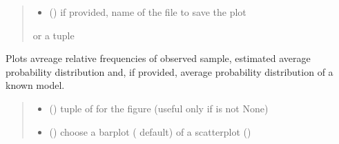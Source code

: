\documentclass[letterpaper,10pt,english]{sphinxmanual}
\begin{document}
\begin{fulllineitems}
\begin{fulllineitems}
\begin{quote}
\begin{description}
\begin{itemize}
\item {} 
\sphinxAtStartPar
{} () \textendash{} if provided, name of the file to save the plot

\end{itemize}

\sphinxAtStartPar
{} or a tuple 

\end{description}\end{quote}

\end{fulllineitems}


\begin{fulllineitems}
\label{\detokenize{cubmods:cubmods.ihg_v.CUBresIHGV.plot_ordinal}}
\pysigstartsignatures
{}
\pysigstopsignatures
\sphinxAtStartPar
Plots avreage relative frequencies of observed sample, estimated 
average probability distribution and,
if provided, average probability distribution of a known model.
\begin{quote}\begin{description}
\begin{itemize}
\item {} 
\sphinxAtStartPar
{} () \textendash{} tuple of  for the figure (useful only if  is not None)

\item {} 
\sphinxAtStartPar
{} () \textendash{} choose a barplot ( default) of a scatterplot ()


\end{itemize}
\end{description}
\end{quote}
\end{fulllineitems}
\end{fulllineitems}
\end{document}
